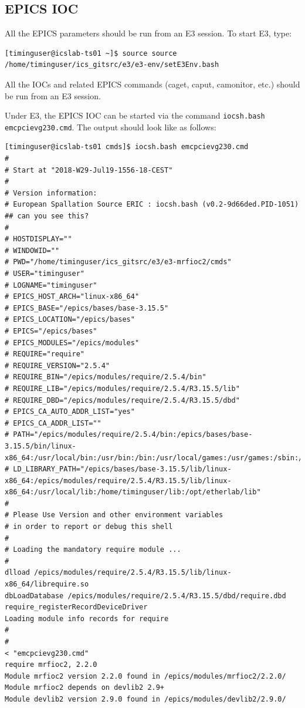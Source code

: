 \documentclass[11pt
  , a4paper
  , article
  , oneside
  , showtrims
]{memoir}
\begin{document}
\subsection{EPICS IOC}
All the EPICS parameters should be run from an E3 session. To start E3, type:
\begin{lstlisting}[style=termstyle]
[timinguser@icslab-ts01 ~]$ source source /home/timinguser/ics_gitsrc/e3/e3-env/setE3Env.bash
\end{lstlisting}
All the IOCs and related EPICS commands (caget, caput, camonitor, etc.) should be run from an E3 session.

Under E3, the EPICS IOC can be started via the command \texttt{iocsh.bash emcpcievg230.cmd}. The output should look like as follows:

\begin{lstlisting}[style=termstyle]
[timinguser@icslab-ts01 cmds]$ iocsh.bash emcpcievg230.cmd
#
# Start at "2018-W29-Jul19-1556-18-CEST"
#
# Version information:
# European Spallation Source ERIC : iocsh.bash (v0.2-9d66ded.PID-1051)
## can you see this?
#
# HOSTDISPLAY=""
# WINDOWID=""
# PWD="/home/timinguser/ics_gitsrc/e3/e3-mrfioc2/cmds"
# USER="timinguser"
# LOGNAME="timinguser"
# EPICS_HOST_ARCH="linux-x86_64"
# EPICS_BASE="/epics/bases/base-3.15.5"
# EPICS_LOCATION="/epics/bases"
# EPICS="/epics/bases"
# EPICS_MODULES="/epics/modules"
# REQUIRE="require"
# REQUIRE_VERSION="2.5.4"
# REQUIRE_BIN="/epics/modules/require/2.5.4/bin"
# REQUIRE_LIB="/epics/modules/require/2.5.4/R3.15.5/lib"
# REQUIRE_DBD="/epics/modules/require/2.5.4/R3.15.5/dbd"
# EPICS_CA_AUTO_ADDR_LIST="yes"
# EPICS_CA_ADDR_LIST=""
# PATH="/epics/modules/require/2.5.4/bin:/epics/bases/base-3.15.5/bin/linux-x86_64:/usr/local/bin:/usr/bin:/bin:/usr/local/games:/usr/games:/sbin:/home/timinguser/bin:/opt/etherlab/bin:/opt/etherlab/sbin"
# LD_LIBRARY_PATH="/epics/bases/base-3.15.5/lib/linux-x86_64:/epics/modules/require/2.5.4/R3.15.5/lib/linux-x86_64:/usr/local/lib:/home/timinguser/lib:/opt/etherlab/lib"
#
# Please Use Version and other environment variables
# in order to report or debug this shell
#
# Loading the mandatory require module ...
#
dlload /epics/modules/require/2.5.4/R3.15.5/lib/linux-x86_64/librequire.so
dbLoadDatabase /epics/modules/require/2.5.4/R3.15.5/dbd/require.dbd
require_registerRecordDeviceDriver
Loading module info records for require
#
#
< "emcpcievg230.cmd"
require mrfioc2, 2.2.0
Module mrfioc2 version 2.2.0 found in /epics/modules/mrfioc2/2.2.0/
Module mrfioc2 depends on devlib2 2.9+
Module devlib2 version 2.9.0 found in /epics/modules/devlib2/2.9.0/

\end{lstlisting}
\end{document}
